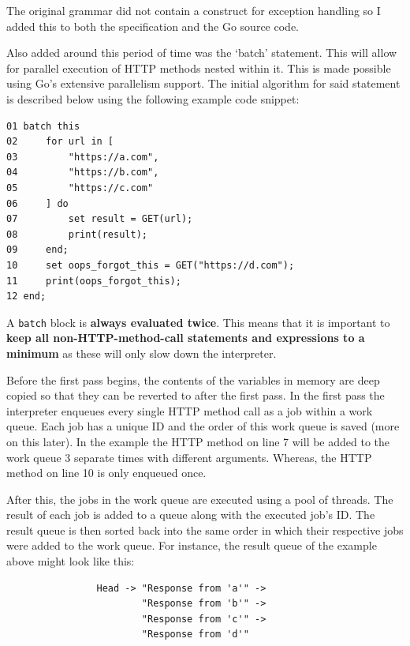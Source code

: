 \documentclass[]{interim}
\theoremstyle{definition}
\begin{document}
The original grammar did not contain a construct for exception handling so I added this to both the specification and the Go source code.

Also added around this period of time was the `batch' statement. This will allow for parallel execution of HTTP methods nested within it. This is made possible using Go's extensive parallelism support. The initial algorithm for said statement is described below using the following example code snippet:

\begin{center}
    \begin{verbatim}
01 batch this
02     for url in [
03         "https://a.com",
04         "https://b.com",
05         "https://c.com"
06     ] do
07         set result = GET(url);
08         print(result);
09     end;
10     set oops_forgot_this = GET("https://d.com");
11     print(oops_forgot_this);
12 end;
    \end{verbatim}
\end{center}

A \verb|batch| block is \textbf{always evaluated twice}. This means that it is important to \textbf{keep all non-HTTP-method-call statements and expressions to a minimum} as these will only slow down the interpreter.

Before the first pass begins, the contents of the variables in memory are deep copied so that they can be reverted to after the first pass. In the first pass the interpreter enqueues every single HTTP method call as a job within a work queue. Each job has a unique ID and the order of this work queue is saved (more on this later). In the example the HTTP method on line 7 will be added to the work queue 3 separate times with different arguments. Whereas, the HTTP method on line 10 is only enqueued once.

After this, the jobs in the work queue are executed using a pool of threads. The result of each job is added to a queue along with the executed job's ID. The result queue is then sorted back into the same order in which their respective jobs were added to the work queue. For instance, the result queue of the example above might look like this:

\begin{center}
    \begin{verbatim}
                Head -> "Response from 'a'" ->
                        "Response from 'b'" ->
                        "Response from 'c'" ->
                        "Response from 'd'"
    \end{verbatim}
\end{center}
\end{document}

